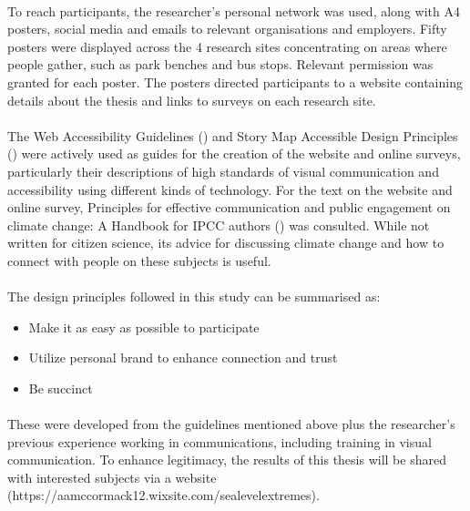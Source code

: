 \paragraph{}

To reach participants, the researcher's personal network was used, along with A4 posters, social media and emails to relevant organisations and employers. Fifty posters were displayed across the 4 research sites concentrating on areas where people gather, such as park benches and bus stops. Relevant permission was granted for each poster. The posters directed participants to a website containing details about the thesis and links to surveys on each research site.
\paragraph{}

The Web Accessibility Guidelines (\cite{henry_web_2022}) and Story Map Accessible Design Principles (\cite{todd_liz_getting_nodate}) were actively used  as guides for the creation of the website and online surveys, particularly their descriptions of high standards of visual communication and accessibility using different kinds of technology. For the text on the website and online survey,  Principles for effective communication and public engagement on	climate change: A Handbook for IPCC authors (\cite{corner_a_principles_2018}) was consulted. While not written for citizen science, its advice for discussing climate change and how to connect with people on these subjects is useful. 
\paragraph{}

The design principles followed in this study can be summarised as:
\begin{itemize}
    \item Make it as easy as possible to participate
    \item Utilize personal brand to enhance connection and trust
    \item Be succinct
\end{itemize}
\paragraph{}
These were developed from the guidelines mentioned above plus the researcher's previous experience working in communications, including training in visual communication. To enhance legitimacy, the results of this thesis will be shared with interested subjects via a website (https://aamccormack12.wixsite.com/sealevelextremes).
